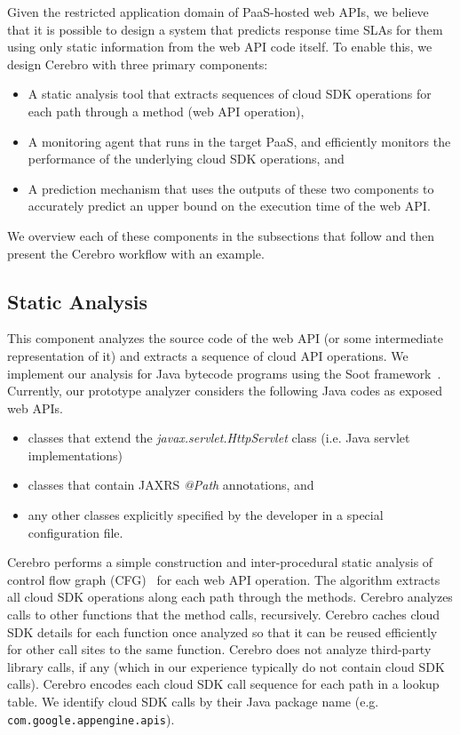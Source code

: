 Given the restricted application domain of PaaS-hosted web APIs, we believe
that it is possible to design a system that predicts response time SLAs for
them using only static information from the web API code itself.  To enable
this, we design Cerebro with three primary components:
\begin{itemize}
\item A static analysis tool that extracts sequences of cloud SDK operations for 
each path through a method (web API operation),
\item A monitoring agent that runs in the target PaaS, and efficiently monitors 
the performance of the underlying cloud SDK operations, and
\item A prediction mechanism that uses the outputs of these two components to accurately predict an upper bound on the execution time of the web API.
\end{itemize}
We overview each of these components in the subsections that follow and then 
present the Cerebro workflow with an example.

\subsection{Static Analysis}
 This component analyzes the source code of the web API
(or some intermediate representation of it) and extracts a sequence of cloud API operations.
We implement our analysis for Java bytecode programs
using the Soot framework~\cite{Vallee-Rai:2010:SJB:1925805.1925818}.
Currently, our prototype analyzer considers the 
following Java codes as exposed web APIs.
\begin{itemize}
\item classes that extend the \textit{javax.servlet.HttpServlet} class (i.e. Java servlet implementations)
\item classes that contain JAXRS \textit{@Path} annotations, and
\item any other classes explicitly specified by the developer in a special configuration file.
\end{itemize}

Cerebro performs a simple construction and inter-procedural static analysis 
of control flow graph 
(CFG)~\cite{Allen:1970:CFA:800028.808479,Aho:1986:CPT:6448,Morgan:1998:BOC:288765,Muchnick:1998:ACD:286076} for each web API operation.
The algorithm extracts all cloud SDK operations along
each path through the methods. Cerebro analyzes calls to other functions
that the method calls, recursively.  Cerebro caches cloud SDK details for each function 
once analyzed so that it can be reused efficiently for other call sites to the same
function. Cerebro does not analyze third-party library calls, if any 
(which in our experience typically do not contain cloud SDK calls). Cerebro encodes
each cloud SDK call sequence for each path in a lookup table. We identify
cloud SDK calls by their Java package name (e.g. \texttt{com.google.appengine.apis}).

